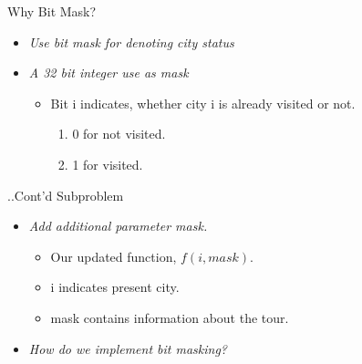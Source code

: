 \documentclass{beamer}
\begin{document}
\begin{frame}{Why Bit Mask?}
\begin{itemize}
    \item<1-> \textit{Use bit mask for denoting city status }\\
    \item<2-> \textit{A 32 bit integer use as mask}\\
    \begin{itemize}
        \item<3-> Bit i indicates, whether city i is already visited or not.
        \begin{enumerate}
            \item<4-> 0 for not visited.
            \item<5> 1 for visited.
        \end{enumerate}
    \end{itemize}
\end{itemize}
\end{frame}
\begin{frame}{..Cont'd Subproblem}
    \begin{itemize}
        \item<1-> \textit{ Add additional parameter mask.}\\
        \begin{itemize}
            \item<2-> Our updated function, $f(i,mask)$.
            \item<3-> i indicates present city.
            \item<4-> mask contains information about the tour.
        \end{itemize}
        \item<4-> \textit{How do we implement bit masking?}\\
    \end{itemize}
\end{frame}
\end{document}
